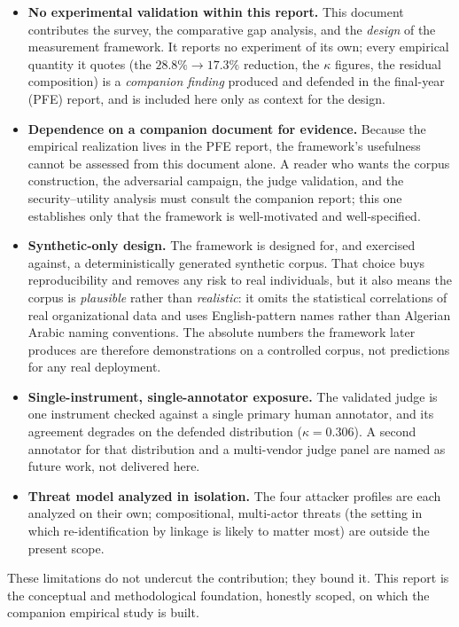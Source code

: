 \documentclass[12pt,a4paper]{report}
\begin{document}
\begin{itemize}[leftmargin=1.4em, itemsep=3pt]
  \item \textbf{No experimental validation within this report.} This document contributes the survey,
    the comparative gap analysis, and the \emph{design} of the measurement framework. It reports no
    experiment of its own; every empirical quantity it quotes (the $28.8\%\!\rightarrow\!17.3\%$
    reduction, the $\kappa$ figures, the residual composition) is a \emph{companion finding}
    produced and defended in the final-year (PFE) report, and is included here only as context for
    the design.
  \item \textbf{Dependence on a companion document for evidence.} Because the empirical realization
    lives in the PFE report, the framework's usefulness cannot be assessed from this document alone.
    A reader who wants the corpus construction, the adversarial campaign, the judge validation, and
    the security--utility analysis must consult the companion report; this one establishes only that
    the framework is well-motivated and well-specified.
  \item \textbf{Synthetic-only design.} The framework is designed for, and exercised against, a
    deterministically generated synthetic corpus. That choice buys reproducibility and removes any
    risk to real individuals, but it also means the corpus is \emph{plausible} rather than
    \emph{realistic}: it omits the statistical correlations of real organizational data and uses
    English-pattern names rather than Algerian Arabic naming conventions. The absolute numbers the
    framework later produces are therefore demonstrations on a controlled corpus, not predictions for
    any real deployment.
  \item \textbf{Single-instrument, single-annotator exposure.} The validated judge is one instrument
    checked against a single primary human annotator, and its agreement degrades on the defended
    distribution ($\kappa = 0.306$). A second annotator for that distribution and a multi-vendor judge
    panel are named as future work, not delivered here.
  \item \textbf{Threat model analyzed in isolation.} The four attacker profiles are each analyzed on
    their own; compositional, multi-actor threats (the setting in which re-identification by
    linkage is likely to matter most) are outside the present scope.
\end{itemize}

These limitations do not undercut the contribution; they bound it. This report is the conceptual and
methodological foundation, honestly scoped, on which the companion empirical study is built.
\end{document}
